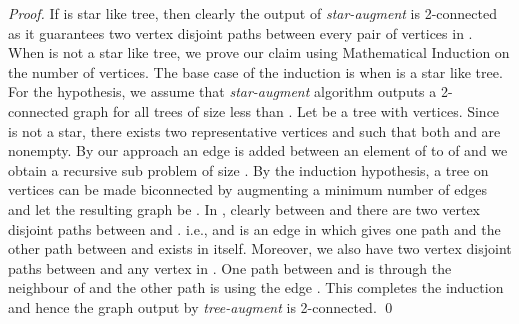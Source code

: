 \documentclass[runningheads]{llncs}
\begin{document}
\begin{proof}
If  is star like tree, then clearly the output of {\em star-augment} is 2-connected as it guarantees two vertex disjoint paths between every pair of vertices in .  When  is not a star like tree, we prove our claim using Mathematical Induction on the number of vertices.  The base case of the induction is when  is a star like tree.  For the hypothesis, we assume that {\em star-augment} algorithm outputs a 2-connected graph for all trees of size less than .  Let  be a tree with  vertices.  Since  is not a star, there exists two representative vertices  and  such that both  and  are nonempty.  By our approach an edge is added between an element  of  to  of  and we obtain a recursive sub problem of size .  By the induction hypothesis, a tree on  vertices can be made biconnected by augmenting a minimum number of edges and let the resulting graph be .  In , clearly between  and  there are two vertex disjoint paths between  and .  i.e.,  and  is an edge in  which gives one path and the other path between  and  exists in  itself.  Moreover, we also have two vertex disjoint paths between  and any vertex  in .  One path between  and  is through the neighbour of  and the other path is using the edge .  This completes the induction and hence the graph output by {\em tree-augment} is 2-connected.   \qed 
\end{proof}
\end{document}
